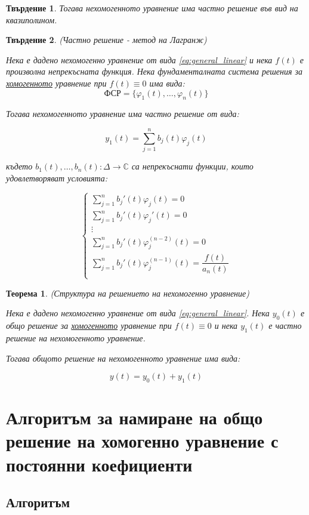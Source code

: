 \documentclass{scrartcl}
\newtheorem{theorem}{Теорема}
\newtheorem{statement}{Твърдение}
\begin{document}
\begin{FlushLeft}
\begin{statement}
Тогава нехомогенното уравнение има частно решение във вид на квазиполином.
\end{statement}

\begin{statement}
(Частно решение - метод на Лагранж)

Нека е дадено нехомогенно уравнение от вида \eqref{eq:general_linear} и нека $f(t)$ е произволна непрекъсната функция.
Нека фундаменталната система решения за \underline{хомогенното} уравнение при $f(t) \equiv 0$ има вида:
$$\text{ФСР} = \{\varphi_1(t), \dots, \varphi_n(t)\}$$

Тогава нехомогенното уравнение има частно решение от вида:

$$y_1(t) = \sum_{j=1}^n b_j(t) \varphi_j(t)$$

където $b_1(t), \dots, b_n(t) : \Delta \rightarrow \mathbb{C}$ са непрекъснати функции, които удовлетворяват условията:

$$
\begin{cases}
    \displaystyle\sum_{j=1}^n b_j'(t)\varphi_j(t) = 0\\
    \displaystyle\sum_{j=1}^n b_j'(t)\varphi_j'(t) = 0\\
    \vdots\\
    \displaystyle\sum_{j=1}^n b_j'(t)\varphi_j^{(n-2)}(t) = 0\\
    \displaystyle\sum_{j=1}^n b_j'(t)\varphi_j^{(n-1)}(t) = \dfrac{f(t)}{a_n(t)}\\
\end{cases}
$$
\end{statement}

\begin{theorem}
(Структура на решението на нехомогенно уравнение)

Нека е дадено нехомогенно уравнение от вида \eqref{eq:general_linear}.
Нека $y_0(t)$ е общо решение за \underline{хомогенното} уравнение при $f(t) \equiv 0$ и нека $y_1(t)$ е частно решение на нехомогенното уравнение.

Тогава общото решение на нехомогенното уравнение има вида:

$$y(t) = y_0(t) + y_1(t)$$    
\end{theorem}

\section{Алгоритъм за намиране на общо решение на хомогенно уравнение с постоянни коефициенти}

\subsection{Алгоритъм}


\end{FlushLeft}
\end{document}
